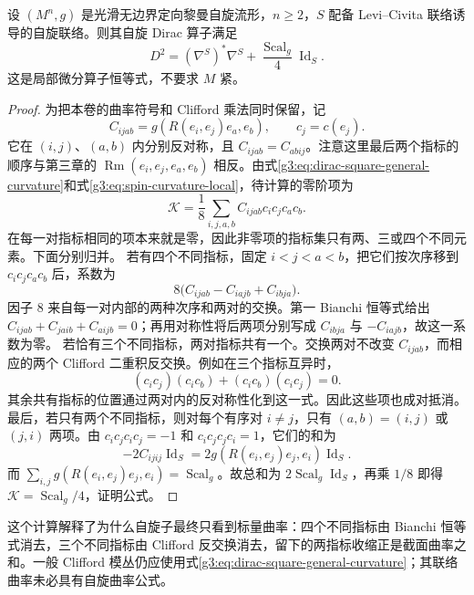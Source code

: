 \begin{theorem}[Lichnerowicz 公式]\label{g3:thm:spin-lichnerowicz}
	设 \((M^n,g)\) 是光滑无边界定向黎曼自旋流形，\(n\ge2\)，\(S\) 配备 Levi--Civita 联络诱导的自旋联络。则其自旋 Dirac 算子满足
	\begin{equation}\label{g3:eq:spin-lichnerowicz}
		D^2=(\nabla^S)^*\nabla^S+\frac{\operatorname{Scal}_g}{4}\operatorname{Id}_S.
	\end{equation}
	这是局部微分算子恒等式，不要求 \(M\) 紧。
\end{theorem}
\begin{proof}
	为把本卷的曲率符号和 Clifford 乘法同时保留，记
	\[
		C_{ijab}=g(R(e_i,e_j)e_a,e_b),\qquad c_j=c(e_j).
	\]
	它在 \((i,j)\)、\((a,b)\) 内分别反对称，且 \(C_{ijab}=C_{abij}\)。注意这里最后两个指标的顺序与第三章的 \(\operatorname{Rm}(e_i,e_j,e_a,e_b)\) 相反。由式\eqref{g3:eq:dirac-square-general-curvature}和式\eqref{g3:eq:spin-curvature-local}，待计算的零阶项为
	\[
		\mathcal K=\frac18\sum_{i,j,a,b}C_{ijab}c_ic_jc_ac_b.
	\]
	在每一对指标相同的项本来就是零，因此非零项的指标集只有两、三或四个不同元素。下面分别归并。
	若有四个不同指标，固定 \(i<j<a<b\)，把它们按次序移到 \(c_ic_jc_ac_b\) 后，系数为
	\[
		8\bigl(C_{ijab}-C_{iajb}+C_{ibja}\bigr).
	\]
	因子 \(8\) 来自每一对内部的两种次序和两对的交换。第一 Bianchi 恒等式给出
	\(C_{ijab}+C_{jaib}+C_{aijb}=0\)；再用对称性将后两项分别写成 \(C_{ibja}\) 与 \(-C_{iajb}\)，故这一系数为零。
	若恰有三个不同指标，两对指标共有一个。交换两对不改变 \(C_{ijab}\)，而相应的两个 Clifford 二重积反交换。例如在三个指标互异时，
	\[
		(c_ic_j)(c_ic_b)+(c_ic_b)(c_ic_j)=0.
	\]
	其余共有指标的位置通过两对内的反对称性化到这一式。因此这些项也成对抵消。
	最后，若只有两个不同指标，则对每个有序对 \(i\ne j\)，只有 \((a,b)=(i,j)\) 或 \((j,i)\) 两项。由 \(c_ic_jc_ic_j=-1\) 和 \(c_ic_jc_jc_i=1\)，它们的和为
	\[
		-2C_{ijij}\operatorname{Id}_S
		=2g(R(e_i,e_j)e_j,e_i)\operatorname{Id}_S.
	\]
	而 \(\sum_{i,j}g(R(e_i,e_j)e_j,e_i)=\operatorname{Scal}_g\)。故总和为 \(2\operatorname{Scal}_g\operatorname{Id}_S\)，再乘 \(1/8\) 即得 \(\mathcal K=\operatorname{Scal}_g/4\)，证明公式。
\end{proof}

这个计算解释了为什么自旋子最终只看到标量曲率：四个不同指标由 Bianchi 恒等式消去，三个不同指标由 Clifford 反交换消去，留下的两指标收缩正是截面曲率之和。一般 Clifford 模丛仍应使用式\eqref{g3:eq:dirac-square-general-curvature}；其联络曲率未必具有自旋曲率公式。

